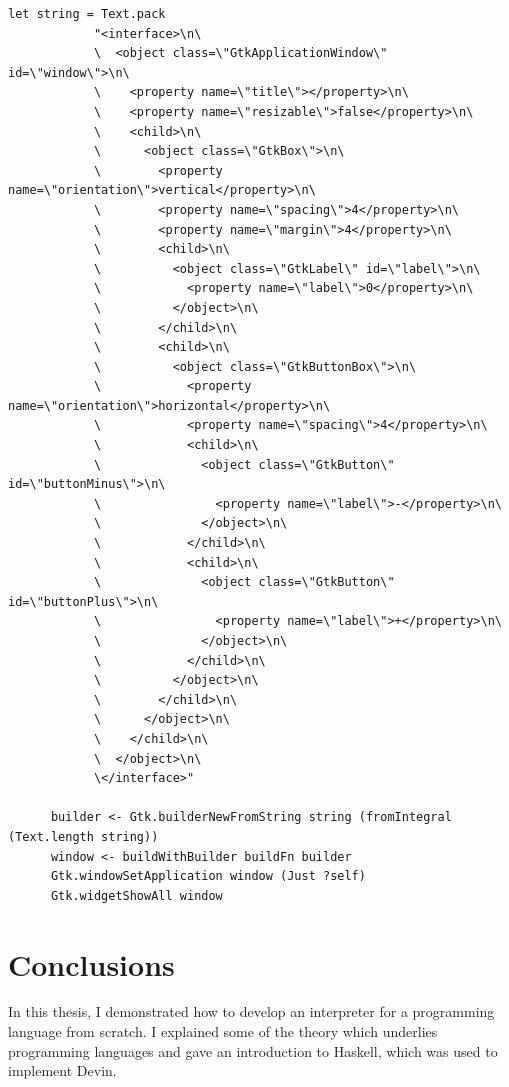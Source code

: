 \documentclass[UdineBachThesis,american,11pt]{PhdThesis}
\begin{document}
  \pagebreak

  \begin{Verbatim}[gobble=4,fontsize=\small]
      let string = Text.pack
            "<interface>\n\
            \  <object class=\"GtkApplicationWindow\" id=\"window\">\n\
            \    <property name=\"title\"></property>\n\
            \    <property name=\"resizable\">false</property>\n\
            \    <child>\n\
            \      <object class=\"GtkBox\">\n\
            \        <property name=\"orientation\">vertical</property>\n\
            \        <property name=\"spacing\">4</property>\n\
            \        <property name=\"margin\">4</property>\n\
            \        <child>\n\
            \          <object class=\"GtkLabel\" id=\"label\">\n\
            \            <property name=\"label\">0</property>\n\
            \          </object>\n\
            \        </child>\n\
            \        <child>\n\
            \          <object class=\"GtkButtonBox\">\n\
            \            <property name=\"orientation\">horizontal</property>\n\
            \            <property name=\"spacing\">4</property>\n\
            \            <child>\n\
            \              <object class=\"GtkButton\" id=\"buttonMinus\">\n\
            \                <property name=\"label\">-</property>\n\
            \              </object>\n\
            \            </child>\n\
            \            <child>\n\
            \              <object class=\"GtkButton\" id=\"buttonPlus\">\n\
            \                <property name=\"label\">+</property>\n\
            \              </object>\n\
            \            </child>\n\
            \          </object>\n\
            \        </child>\n\
            \      </object>\n\
            \    </child>\n\
            \  </object>\n\
            \</interface>"

      builder <- Gtk.builderNewFromString string (fromIntegral (Text.length string))
      window <- buildWithBuilder buildFn builder
      Gtk.windowSetApplication window (Just ?self)
      Gtk.widgetShowAll window
  \end{Verbatim}

  \chapter{Conclusions}

  In this thesis, I demonstrated how to develop an interpreter for a programming
  language from scratch. I explained some of the theory which underlies
  programming languages and gave an introduction to Haskell, which was used to
  implement Devin.
\end{document}
